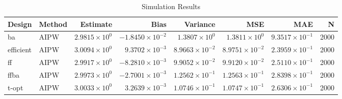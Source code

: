 \begin{table}[ht]
\centering
\begin{tabular}{llrrrrrr}
  \toprule
Design & Method & Estimate & Bias & Variance & MSE & MAE & N \\ 
  \midrule
ba & AIPW & $2.9815 \times 10^{0}$ & $-1.8450 \times 10^{-2}$ & $1.3807 \times 10^{0}$ & $1.3811 \times 10^{0}$ & $9.3517 \times 10^{-1}$ & 2000 \\ 
   \midrule
efficient & AIPW & $3.0094 \times 10^{0}$ & $9.3702 \times 10^{-3}$ & $8.9663 \times 10^{-2}$ & $8.9751 \times 10^{-2}$ & $2.3959 \times 10^{-1}$ & 2000 \\ 
   \midrule
ff & AIPW & $2.9917 \times 10^{0}$ & $-8.2810 \times 10^{-3}$ & $9.9052 \times 10^{-2}$ & $9.9120 \times 10^{-2}$ & $2.5110 \times 10^{-1}$ & 2000 \\ 
   \midrule
ffba & AIPW & $2.9973 \times 10^{0}$ & $-2.7001 \times 10^{-3}$ & $1.2562 \times 10^{-1}$ & $1.2563 \times 10^{-1}$ & $2.8398 \times 10^{-1}$ & 2000 \\ 
   \midrule
t-opt & AIPW & $3.0033 \times 10^{0}$ & $3.2639 \times 10^{-3}$ & $1.0746 \times 10^{-1}$ & $1.0747 \times 10^{-1}$ & $2.6306 \times 10^{-1}$ & 2000 \\ 
   \bottomrule
\end{tabular}
\caption{Simulation Results} 
\label{tab:results}
\end{table}
